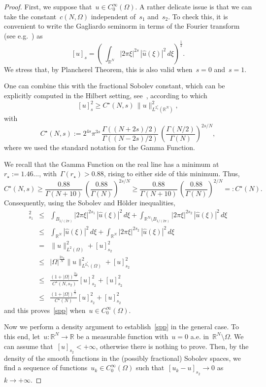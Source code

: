 \documentclass[12pt,a4paper,intlimits,sumlimits]{amsart}
\def \R {\mathbb{R}}
\theoremstyle{definition}
\theoremstyle{plain}
\numberwithin{equation}{section}
\renewcommand{\le}{\leqslant}
\renewcommand{\ge}{\geqslant}
\begin{document}
\begin{proof} First, we suppose that~$u\in C^\infty_0(\Omega)$.
A rather delicate issue is that we can take the constant~$c(N,\Omega)$ independent
of~$s_1$ and~$s_2$. To check this, it is convenient to write the Gagliardo seminorm in terms of the Fourier transform (see e.g.~\cite{MR2944369}) as
$$ [u]_s=\left(\;\int_{\R^{N}} |2\pi \xi|^{2s}\,|\widehat u(\xi)|^2\,d\xi\right)^{\frac12}.$$
We stress that, by Plancherel Theorem, this is also valid when~$s=0$ and~$s=1$.

One can combine this with the fractional Sobolev constant, which can be explicitly computed
in the Hilbert setting, see~\cite[formula~(2)]{MR3179693}, according to which
$$ [u]_s^2\ge C^\star(N,s)\,\|u\|_{L^{2^*_s}(\R^N)}^2,$$
with
\[ C^\star(N,s):= 2^{4s} \pi^{3s} \, \frac{\Gamma((N+2s)/2)}{\Gamma((N-2s)/2)} \, \left(\frac{\Gamma(N/2)}{\Gamma(N)}\right)^{2s/N},
\]
where we used the standard notation for the Gamma Function.

We recall that the Gamma Function on the real line has a minimum at~$r_\star:=1.46...$, with~$\Gamma(r_\star)>0.88$,  rising to either side of this minimum. Thus,
\[ C^\star(N,s)\ge \frac{0.88}{\Gamma(N+10)} \, \left(\frac{0.88}{\Gamma(N)}\right)^{2s/N}\ge\frac{0.88}{\Gamma(N+10)} \, \left(\frac{0.88}{\Gamma(N)}\right)^{2/N}=:C^\star(N).
\]
Consequently, using the Sobolev and H\"older inequalities,
\begin{eqnarray*}
[u]_{s_1}^2&\le& \int_{B_{1/(2\pi)}} |2\pi \xi|^{2s_1}\,|\widehat u(\xi)|^2\,d\xi+\int_{\R^N\setminus B_{1/(2\pi)}} |2\pi \xi|^{2s_2}\,|\widehat u(\xi)|^2\,d\xi\\
&\le&  \int_{\R^N} |\widehat u(\xi)|^2\,d\xi+\int_{\R^N} |2\pi \xi|^{2s_2}\,|\widehat u(\xi)|^2\,d\xi
\\&=& \|u\|^2_{L^2(\Omega)}+[u]^2_{s_2}
\\&\le& |\Omega|^{\frac{2s_2}{N}}\|u\|^2_{L^{2^*_{s_2}}(\Omega)}+[u]^2_{s_2}
\\&\le&\frac{(1+|\Omega|)^{\frac{2s_2}{N}}}{C^\star(N,s_2)}[u]^2_{s_2}+[u]^2_{s_2}
\\&\le&\frac{(1+|\Omega|)^{\frac{2}{N}}}{C^\star(N)}[u]^2_{s_2}+[u]^2_{s_2}
\end{eqnarray*}
and this proves~\eqref{spp} when~$u\in C^\infty_0(\Omega)$.

Now we perform a density argument to establish~\eqref{spp} in the general case.
To this end, let~$u:\R^N\to\R$ be a measurable function with~$u=0$ a.e. in~$\R^N\setminus\Omega$. We can assume that~$[u]_{s_2}<+\infty$, otherwise there is nothing to prove. Then, by the density of the smooth functions in the (possibly fractional) Sobolev spaces,
we find a sequence of functions~$u_k\in C^\infty_0(\Omega)$ such that~$[u_k-u]_{s_2}\to0$ as~$k\to+\infty$.


\end{proof}
\end{document}
